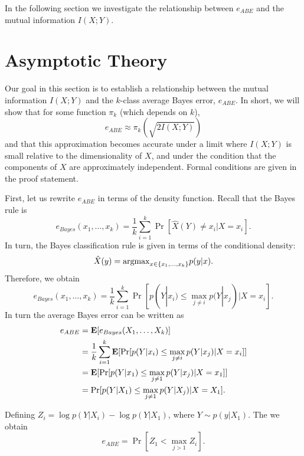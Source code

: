 \documentclass[12pt]{article}
\begin{document}
In the following section we investigate the relationship between $e_{ABE}$ and the mutual information $I(X; Y)$.

\section{Asymptotic Theory}

Our goal in this section is to establish a relationship between the mutual information $I(X; Y)$ and the $k$-class average Bayes error, $e_{ABE}$.
In short, we will show that for some function $\pi_k$ (which depends on $k$), 
\[
e_{ABE} \approx \pi_k(\sqrt{2 I(X; Y)})
\]
and that this approximation becomes accurate under a limit where $I(X; Y)$ is small relative to the dimensionality of $X$,
and under the condition that the components of $X$ are approximately independent.  Formal conditions are given in the proof statement.

First, let us rewrite $e_{ABE}$ in terms of the density function.  Recall that the Bayes rule is
\[
e_{Bayes}(x_1,\hdots, x_k) = \frac{1}{k}\sum_{i=1}^k \Pr[\hat{X}(Y) \neq x_i| X = x_i].
\]
In turn, the Bayes classification rule is given in terms of the conditional density:
\[
\hat{X}(y) = \text{argmax}_{x \in \{x_1,\hdots, x_k\}} p(y|x).
\]
Therefore, we obtain
\[
e_{Bayes}(x_1,\hdots, x_k) = \frac{1}{k}\sum_{i=1}^k \Pr[p(Y|x_i) \leq \max_{j \neq i} p(Y|x_j)| X = x_i].
\]
In turn the average Bayes error can be written as
\begin{align}
e_{ABE} &= \textbf{E}[e_{Bayes}(X_1,\hdots, X_k)]
\\&= \frac{1}{k}\sum_{i=1}^k \textbf{E}[\Pr[p(Y|x_i) \leq \max_{j \neq i} p(Y|x_j)| X = x_i]]
\\&= \textbf{E}[\Pr[p(Y|x_1) \leq \max_{j \neq 1} p(Y|x_j)| X = x_1]]
\\&= \Pr[p(Y|X_1) \leq \max_{j \neq 1} p(Y|X_j)| X = X_1].
\end{align}

Defining $Z_i = \log p(Y|X_i) - \log p(Y|X_1)$, where $Y \sim p(y|X_1)$.
The we obtain
\[
e_{ABE} = \Pr[Z_1 < \max_{j > 1} Z_i].
\]
\end{document}
